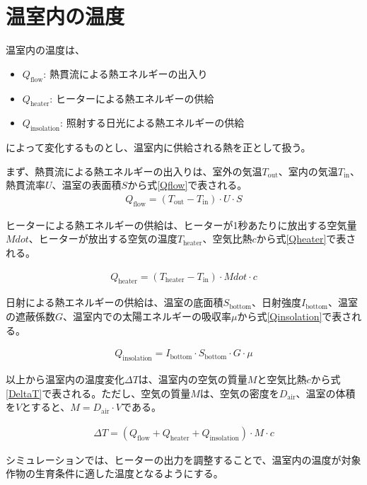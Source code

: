 \documentclass[uplatex,dvipdfmx,nomag,a4paper,oneside,onecolumn,12pt]{bxjsreport} %
\begin{document}
\section{温室内の温度}
温室内の温度は、
\begin{itemize}
    \item \(Q_\text{flow}\): 熱貫流による熱エネルギーの出入り
    \item \(Q_\text{heater}\): ヒーターによる熱エネルギーの供給
    \item \(Q_\text{insolation}\): 照射する日光による熱エネルギーの供給
\end{itemize}
によって変化するものとし、温室内に供給される熱を正として扱う。

まず、熱貫流による熱エネルギーの出入りは、室外の気温\(T_\text{out}\)、室内の気温\(T_\text{in}\)、熱貫流率\(U\)、温室の表面積\(S\)から式\eqref{Qflow}で表される。
\begin{align}
    Q_\text{flow} = (T_\text{out} - T_\text{in}) \cdot U \cdot S
    \label{Qflow}
\end{align}

ヒーターによる熱エネルギーの供給は、ヒーターが1秒あたりに放出する空気量\(Mdot\)、ヒーターが放出する空気の温度\(T_\text{heater}\)、空気比熱\(c\)から式\eqref{Qheater}で表される。

\begin{align}
    Q_\text{heater} = (T_\text{heater} - T_\text{in}) \cdot Mdot \cdot c
    \label{Qheater}
\end{align}

日射による熱エネルギーの供給は、温室の底面積\(S_\text{bottom}\)、日射強度\(I_\text{bottom}\)、温室の遮蔽係数\(G\)、温室内での太陽エネルギーの吸収率\(\mu\)から式\eqref{Qinsolation}で表される。

\begin{align}
    Q_\text{insolation} = I_\text{bottom} \cdot S_\text{bottom} \cdot G \cdot \mu
    \label{Qinsolation}
\end{align}

以上から温室内の温度変化\(\Delta T\)は、温室内の空気の質量\(M\)と空気比熱\(c\)から式\eqref{DeltaT}で表される。ただし、空気の質量\(M\)は、空気の密度を\(D_\text{air}\)、温室の体積を\(V\)とすると、\(M = D_\text{air} \cdot V\)である。

\begin{align}
    \Delta T = (Q_\text{flow} + Q_\text{heater} + Q_\text{insolation}) \cdot M \cdot c
    \label{DeltaT}
\end{align}

シミュレーションでは、ヒーターの出力を調整することで、温室内の温度が対象作物の生育条件に適した温度となるようにする。
\end{document}
